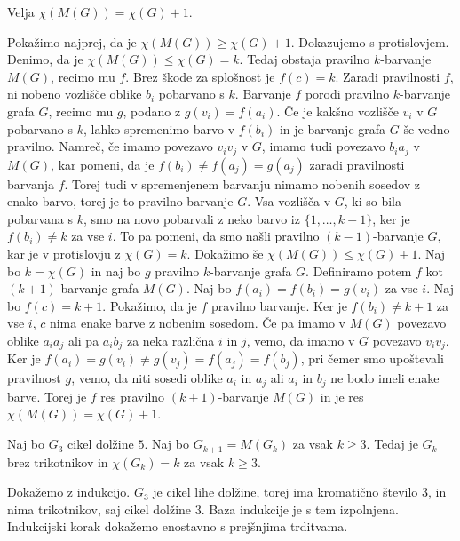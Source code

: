 \documentclass[mat1, tisk]{fmfdelo}
\begin{document}
    \begin{trditev}
        Velja $\chi(M(G)) = \chi(G) + 1$.
    \end{trditev}

    \begin{dokaz}
        Pokažimo najprej, da je $\chi(M(G)) \geq \chi(G) + 1$. Dokazujemo s protislovjem. Denimo, da je $\chi(M(G)) \leq \chi(G) = k$. Tedaj obstaja pravilno $k$-barvanje $M(G)$, recimo mu $f$.
        Brez škode za splošnost je $f(c) = k$. Zaradi pravilnosti $f$, ni nobeno vozlišče oblike $b_i$ pobarvano s $k$. Barvanje $f$ porodi pravilno $k$-barvanje grafa $G$, recimo mu $g$, podano 
        z $g(v_i) = f(a_i)$. Če je kakšno vozlišče $v_i$ v $G$ pobarvano s $k$, lahko spremenimo barvo v $f(b_i)$ in je barvanje grafa $G$ še vedno pravilno. Namreč, če imamo povezavo $v_iv_j$ v $G$, 
        imamo tudi povezavo $b_ia_j$ v $M(G)$, kar pomeni, da je $f(b_i) \neq f(a_j) = g(a_j)$ zaradi pravilnosti barvanja $f$. Torej tudi v spremenjenem barvanju nimamo nobenih sosedov z enako barvo,
        torej je to pravilno barvanje $G$. Vsa vozlišča v $G$, ki so bila pobarvana s $k$, smo na novo pobarvali z neko barvo iz $\{1, \ldots, k-1\}$, ker je $f(b_i) \neq k$ za vse $i$. To pa pomeni,
        da smo našli pravilno $(k-1)$-barvanje $G$, kar je v protislovju z $\chi(G) = k$.
        Dokažimo še $\chi(M(G)) \leq \chi(G) + 1$. Naj bo $k = \chi(G)$ in naj bo $g$ pravilno $k$-barvanje grafa $G$. Definiramo potem $f$ kot $(k+1)$-barvanje grafa $M(G)$. Naj bo $f(a_i) = f(b_i) = g(v_i)$
        za vse $i$. Naj bo $f(c) = k + 1$. Pokažimo, da je $f$ pravilno barvanje. Ker je $f(b_i) \neq k + 1$ za vse $i$, $c$ nima enake barve z nobenim sosedom. Če pa imamo v $M(G)$ povezavo oblike $a_ia_j$ ali 
        pa $a_ib_j$ za neka različna $i$ in $j$, vemo, da imamo v $G$ povezavo $v_iv_j$. Ker je $f(a_i) = g(v_i) \neq g(v_j) = f(a_j) = f(b_j)$, pri čemer smo upoštevali pravilnost $g$, vemo, da niti sosedi oblike
        $a_i$ in $a_j$ ali $a_i$ in $b_j$ ne bodo imeli enake barve. Torej je $f$ res pravilno $(k+1)$-barvanje $M(G)$ in je res $\chi(M(G)) = \chi(G) + 1$.
    \end{dokaz}

    \begin{posledica}
        Naj bo $G_3$ cikel dolžine $5$. Naj bo $G_{k+1} = M(G_k)$ za vsak $k \geq 3$. Tedaj je $G_k$ brez trikotnikov in $\chi(G_k) = k$ za vsak $k \geq 3$.
    \end{posledica}

    \begin{dokaz}
        Dokažemo z indukcijo. $G_3$ je cikel lihe dolžine, torej ima kromatično število $3$, in nima trikotnikov, saj cikel dolžine $3$. Baza indukcije je s tem izpolnjena. Indukcijski korak dokažemo enostavno 
        s prejšnjima trditvama.
    \end{dokaz}
\end{document}
